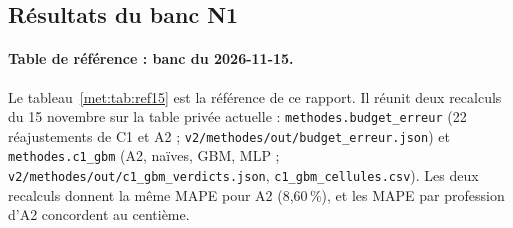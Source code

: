 \subsection{Résultats du banc N1}
\label{met:resultats}

\paragraph{Table de référence : banc du 2026-11-15.} Le tableau~\ref{met:tab:ref15} est la référence de ce
rapport. Il réunit deux recalculs du 15 novembre sur la table privée actuelle : \texttt{methodes.budget\_erreur}
(22 réajustements de C1 et A2 ; \texttt{v2/methodes/out/budget\_erreur.json}) et \texttt{methodes.c1\_gbm}
(A2, naïves, GBM, MLP ; \texttt{v2/methodes/out/c1\_gbm\_verdicts.json}, \texttt{c1\_gbm\_cellules.csv}).
Les deux recalculs donnent la même MAPE pour A2 (8,60\,\%\mesure), et les MAPE par profession d'A2
concordent au centième.

\begin{table}[ht]
\centering\small
{}
\caption{Banc N1, périmètre privé, MAPE par département à $h = 5$ (\%), table privée du 2026-11-15. Les
valeurs par profession sont mesurées\mesure{} sauf la persistance, moyennée par profession à partir des 22
lignes cellule de \texttt{c1\_gbm\_cellules.csv}\derive. Les IC sont des IC bootstrap \emph{du niveau} de
MAPE, à ne pas comparer aux IC d'écarts du tableau~\ref{met:tab:ref14}. A0, A1a, A1b, A3, A123, B4, APC
et C2 n'ont pas été recalculés sur cette table.}
\label{met:tab:ref15}
\end{table}

